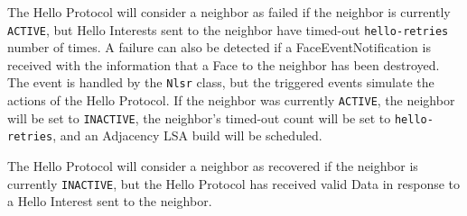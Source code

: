 The Hello Protocol will consider a neighbor as failed if the neighbor is currently \texttt{ACTIVE}, but Hello Interests sent to the neighbor have timed-out \texttt{hello-retries} number of times.
A failure can also be detected if a FaceEventNotification is received with the information that a Face to the neighbor has been destroyed.
The event is handled by the \texttt{Nlsr} class, but the triggered events simulate the actions of the Hello Protocol.
If the neighbor was currently \texttt{ACTIVE}, the neighbor will be set to \texttt{INACTIVE}, the neighbor's timed-out count will be set to \texttt{hello-retries}, and an Adjacency LSA build will be scheduled.

The Hello Protocol will consider a neighbor as recovered if the neighbor is currently \texttt{INACTIVE}, but the Hello Protocol has received valid Data in response to a Hello Interest sent to the neighbor.
